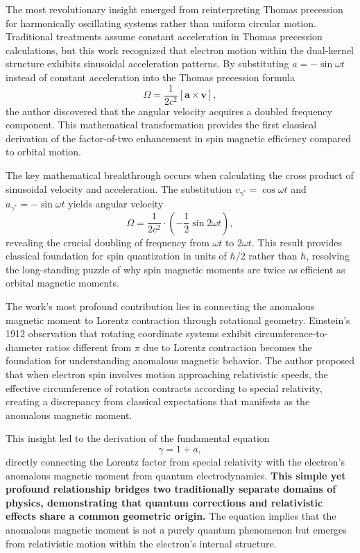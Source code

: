 \documentclass[%
 reprint,
 amsmath,amssymb,
 aps,
]{revtex4-1}
\numberwithin{equation}{section}%
\begin{document}
The most revolutionary insight emerged from reinterpreting Thomas precession for harmonically oscillating systems rather than uniform circular motion. Traditional treatments assume constant acceleration in Thomas precession calculations, but this work recognized that electron motion within the dual-kernel structure exhibits sinusoidal acceleration patterns. By substituting $a = -\sin\omega t$ instead of constant acceleration into the Thomas precession formula
\begin{equation}
\Omega = \frac{1}{2c^2}[\mathbf{a} \times \mathbf{v}],
\end{equation}
the author discovered that the angular velocity acquires a doubled frequency component. This mathematical transformation provides the first classical derivation of the factor-of-two enhancement in spin magnetic efficiency compared to orbital motion.

The key mathematical breakthrough occurs when calculating the cross product of sinusoidal velocity and acceleration. The substitution $v_{\gamma^*} = \cos\omega t$ and $a_{\gamma^*} = -\sin\omega t$ yields angular velocity
\begin{equation}
\Omega = \frac{1}{2c^2} \cdot \left( -\frac{1}{2}\sin 2\omega t \right),
\end{equation}
revealing the crucial doubling of frequency from $\omega t$ to $2\omega t$. This result provides classical foundation for spin quantization in units of $\hbar/2$ rather than $\hbar$, resolving the long-standing puzzle of why spin magnetic moments are twice as efficient as orbital magnetic moments.

The work's most profound contribution lies in connecting the anomalous magnetic moment to Lorentz contraction through rotational geometry. Einstein's 1912 observation that rotating coordinate systems exhibit circumference-to-diameter ratios different from $\pi$ due to Lorentz contraction becomes the foundation for understanding anomalous magnetic behavior. The author proposed that when electron spin involves motion approaching relativistic speeds, the effective circumference of rotation contracts according to special relativity, creating a discrepancy from classical expectations that manifests as the anomalous magnetic moment.

This insight led to the derivation of the fundamental equation
\begin{equation}
\gamma = 1 + a,
\label{eq:gamma_anomaly_relation}
\end{equation}
directly connecting the Lorentz factor from special relativity with the electron's anomalous magnetic moment from quantum electrodynamics. \textbf{This simple yet profound relationship bridges two traditionally separate domains of physics, demonstrating that quantum corrections and relativistic effects share a common geometric origin.} The equation implies that the anomalous magnetic moment is not a purely quantum phenomenon but emerges from relativistic motion within the electron's internal structure.
\end{document}
